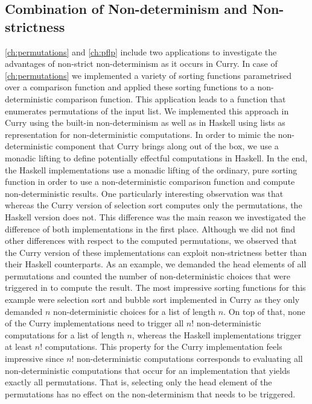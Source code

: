 %

\subsection*{Combination of Non-determinism and Non-strictness}

\autoref{ch:permutations} and \autoref{ch:pflp} include two applications to investigate the advantages of non-strict non-determinism as it occurs in Curry.
In case of \autoref{ch:permutations} we implemented a variety of sorting functions parametrised over a comparison function and applied these sorting functions to a non-deterministic comparison function.
This application leads to a function that enumerates permutations of the input list.
We implemented this approach in Curry using the built-in non-determinism as well as in Haskell using lists as representation for non-deterministic computations.
In order to mimic the non-deterministic component that Curry brings along out of the box, we use a monadic lifting to define potentially effectful computations in Haskell.
In the end, the Haskell implementations use a monadic lifting of the ordinary, pure sorting function in order to use a non-deterministic comparison function and compute non-deterministic results.
One particularly interesting observation was that whereas the Curry version of selection sort computes only the permutations, the Haskell version does not.
This difference was the main reason we investigated the difference of both implementations in the first place.
Although we did not find other differences with respect to the computed permutations, we observed that the Curry version of these implementations can exploit non-strictness better than their Haskell counterparts.
As an example, we demanded the head elements of all permutations and counted the number of non-deterministic choices that were triggered in to compute the result.
The most impressive sorting functions for this example were selection sort and bubble sort implemented in Curry as they only demanded $n$ non-deterministic choices for a list of length $n$.
On top of that, none of the Curry implementations need to trigger all $n!$ non-deterministic computations for a list of length $n$, whereas the Haskell implementations trigger at least $n!$ computations.
This property for the Curry implementation feels impressive since $n!$ non-deterministic computations corresponds to evaluating all non-deterministic computations that occur for an implementation that yields exactly all permutations.
That is, selecting only the head element of the permutations has no effect on the non-determinism that needs to be triggered.

